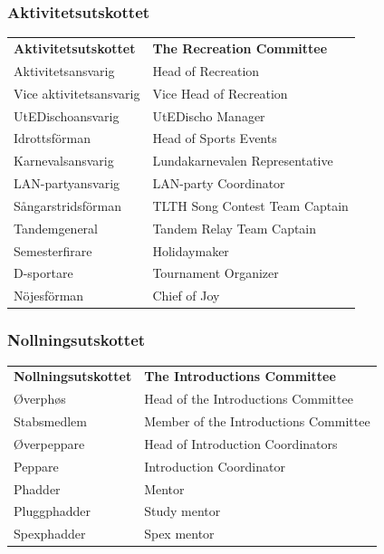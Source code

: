 \documentclass{dsekprotokoll}
\begin{document}
\subsubsection*{Aktivitetsutskottet}
\vspace{12pt}
\begin{center}
    \begin{tabular}{R{6.5cm}|L{6.5cm}}
        \textbf{Aktivitetsutskottet} & \textbf{The Recreation Committee}\\
        Aktivitetsansvarig & Head of Recreation\\
        Vice aktivitetsansvarig & Vice Head of Recreation\\
        UtEDischoansvarig & UtEDischo Manager\\
        Idrottsförman & Head of Sports Events\\
        Karnevalsansvarig & Lundakarnevalen Representative\\
        LAN-partyansvarig & LAN-party Coordinator\\
        Sångarstridsförman & TLTH Song Contest Team Captain\\
        Tandemgeneral & Tandem Relay Team Captain\\
        Semesterfirare & Holidaymaker\\
        D-sportare & Tournament Organizer\\
        Nöjesförman & Chief of Joy\\
    \end{tabular}
\end{center}

\subsubsection*{Nollningsutskottet}
\vspace{12pt}
\begin{center}
    \begin{tabular}{R{7.4cm}|L{7.4cm}}
        \textbf{Nollningsutskottet} & \textbf{The Introductions Committee}\\
        Øverphøs & Head of the Introductions Committee\\
        Stabsmedlem & Member of the Introductions Committee\\
        Øverpeppare & Head of Introduction Coordinators\\
        Peppare & Introduction Coordinator\\
        Phadder & Mentor\\
        Pluggphadder & Study mentor\\
        Spexphadder & Spex mentor\\
    \end{tabular}
\end{center}
\end{document}
